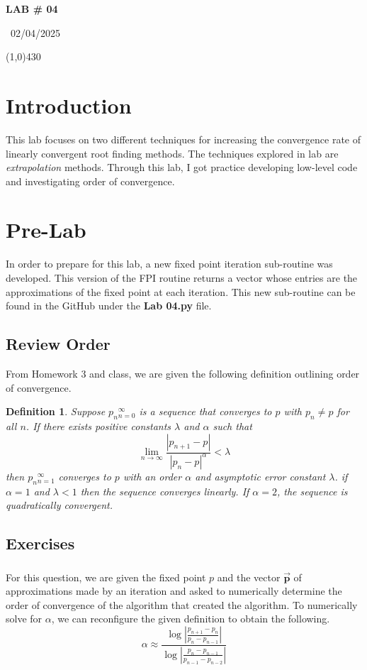 \documentclass{article}
\newtheorem{definition}{Definition}
\begin{document}
\begin{center}
 \LARGE\bfseries LAB \# 04
\end{center}
\begin{center}
    ~02/04/2025~
\end{center}
 \line(1,0){430}

\section{Introduction}
This lab focuses on two different techniques for increasing the convergence rate of linearly convergent root finding methods. The techniques explored in lab are \textit{extrapolation} methods. Through this lab, I got practice developing low-level code and investigating order of convergence.

\section{Pre-Lab}
In order to prepare for this lab, a new fixed point iteration sub-routine was developed. This version of the FPI routine returns a vector whose entries are the approximations of the fixed point at each iteration. This new sub-routine can be found in the GitHub under the \textbf{Lab 04.py} file.

\subsection{Review Order}
From Homework 3 and class, we are given the following definition outlining order of convergence.
\begin{definition}
    Suppose {\(p_n\)}\(_{n=0}^\infty\) is a sequence that converges to \(p\) with \(p_n \neq p\) for all \(n\). If there exists positive constants \(\lambda\) and \(\alpha\) such that
    \[
    \lim_{n \to \infty}\frac{|p_{n+1}-p|}{|p_{n}-p|^\alpha} < \lambda
    \]
    then {\(p_n\)}\(_{n=1}^\infty\) converges to \(p\) with an order \(\alpha\) and asymptotic error constant \(\lambda\). if \(\alpha = 1\) and \(\lambda \lt 1\) then the sequence converges \textit{linearly}. If \(\alpha = 2\), the sequence is quadratically convergent.
\end{definition}

\subsection{Exercises}
\subsubsection{}
For this question, we are given the fixed point \(p\) and the vector \(\vec{\textbf{p}}\) of approximations made by an iteration and asked to numerically determine the order of convergence of the algorithm that created the algorithm. To numerically solve for \(\alpha\), we can reconfigure the given definition to obtain the following.
\[
\alpha \approx \frac{\log|\frac{p_{n+1}-p_n}{p_n-p_{n-1}}|}{\log|\frac{p_n-p_{n-1}}{p_{n-1}-p_{n-2}}|}
\]
\end{document}
